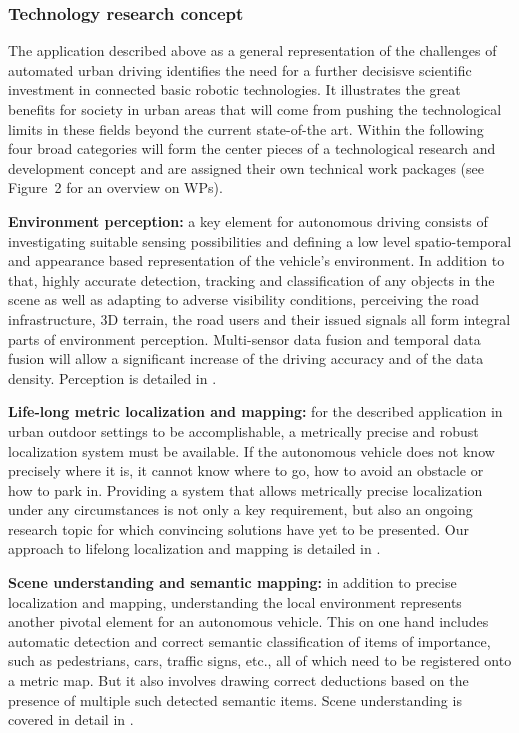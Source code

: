 \subsubsection{Technology research concept}
The application described above as a general representation of the challenges of automated urban driving identifies the need for a further decisisve scientific investment in connected basic robotic technologies. It illustrates the great benefits for society in urban areas that will come from pushing the technological limits in these fields beyond the current state-of-the art. Within \Project{} the following four broad categories will form the center pieces of a technological research and development concept and are assigned their own technical work packages (see Figure~2 for an overview on WPs).
\begin{denseItemize}

\item \textbf{Environment perception:} a key element for autonomous driving consists of investigating suitable sensing possibilities and defining a low level spatio-temporal and appearance based representation of the vehicle's environment. In addition to that, highly accurate detection, tracking and classification of any objects in the scene as well as adapting to adverse visibility conditions, perceiving the road infrastructure, 3D terrain, the road users and their issued signals all form integral parts of environment perception. Multi-sensor data fusion and temporal data fusion will allow a significant increase of the driving accuracy and of the data density. Perception is detailed in \WPPerception.

\item \textbf{Life-long metric localization and mapping:} for the described application in urban outdoor settings to be accomplishable, a metrically precise and robust localization system must be available. If the autonomous vehicle does not know precisely where it is, it cannot know where to go, how to avoid an obstacle or how to park in. Providing a system that allows metrically precise localization under any circumstances is not only a key requirement, but also an ongoing research topic for which convincing solutions have yet to be presented. Our approach to lifelong localization and mapping is detailed in \WPMapping.

\item \textbf{Scene understanding and semantic mapping:} in addition to precise localization and mapping, understanding the local environment represents another pivotal element for an autonomous vehicle. This on one hand includes automatic detection and correct semantic classification of items of importance, such as pedestrians, cars, traffic signs, etc., all of which need to be registered onto a metric map. But it also involves drawing correct deductions based on the presence of multiple such detected semantic items. Scene understanding is covered in detail in \WPSceneUnderstanding.


\end{denseItemize}
